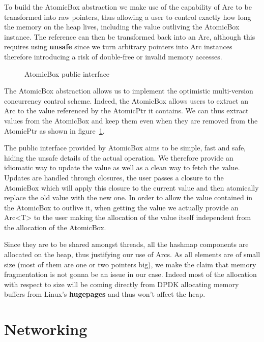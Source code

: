\documentclass[11pt]{book}
\begin{document}
To build the AtomicBox abstraction we make use of the capability of
Arc to be transformed into raw pointers, thus allowing a user to
control exactly how long the memory on the heap lives, including the
value outliving the AtomicBox instance. The reference can then be
transformed back into an Arc, although this requires using
\textbf{unsafe} since we turn arbitrary pointers into Arc instances
therefore introducing a risk of double-free or invalid memory
accesses.

\begin{figure}[htb!]
  \label{code:atomicbox-interface}
  
  \caption{AtomicBox public interface}
\end{figure}

The AtomicBox abstraction allows us to implement the optimistic
multi-version concurrency control scheme. Indeed, the AtomicBox allows
users to extract an Arc to the value referenced by the AtomicPtr it
contains. We can thus extract values from the AtomicBox and keep them
even when they are removed from the AtomicPtr as shown in
figure~\ref{code:atomicbox-interface}.

The public interface provided by AtomicBox aims to be simple, fast and
safe, hiding the unsafe details of the actual operation. We therefore
provide an idiomatic way to update the value as well as a clean way to
fetch the value. Updates are handled through closures, the user passes
a closure to the AtomicBox which will apply this closure to the
current value and then atomically replace the old value with the new
one. In order to allow the value contained in the AtomicBox to outlive
it, when getting the value we actually provide an Arc<T> to the user
making the allocation of the value itself independent from the
allocation of the AtomicBox.

Since they are to be shared amongst threads, all the hashmap
components are allocated on the heap, thus justifying our use of
Arcs. As all elements are of small size (most of them are one or two
pointers big), we make the claim that memory fragmentation is not
gonna be an issue in our case. Indeed most of the allocation with
respect to size will be coming directly from DPDK allocating memory
buffers from Linux's \textbf{hugepages} and thus won't affect the
heap.


\section{Networking}
\end{document}
